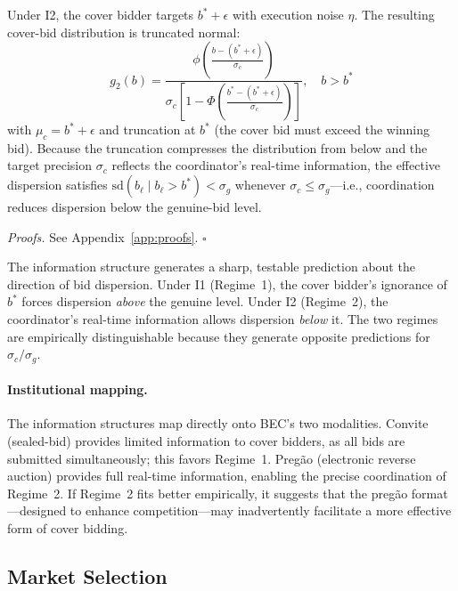 \begin{proposition}
\label{prop:regime2}
Under I2, the cover bidder targets $b^* + \epsilon$ with execution
noise $\eta$. The resulting cover-bid distribution is truncated
normal:
\begin{equation}
  g_2(b) = \frac{\phi\!\left(\frac{b - (b^* + \epsilon)}
  {\sigma_c}\right)}{\sigma_c\left[1 - \Phi\!\left(
  \frac{b^* - (b^* + \epsilon)}{\sigma_c}\right)\right]},
  \quad b > b^*
  \label{eq:regime2}
\end{equation}
with $\mu_c = b^* + \epsilon$ and truncation at $b^*$ (the cover
bid must exceed the winning bid). Because the truncation compresses
the distribution from below and the target precision $\sigma_c$
reflects the coordinator's real-time information, the effective
dispersion satisfies $\text{sd}(b_\ell \mid b_\ell > b^*) <
\sigma_g$ whenever $\sigma_c \leq \sigma_g$---i.e., coordination
reduces dispersion below the genuine-bid level.
\end{proposition}

\noindent\emph{Proofs.} See Appendix~\ref{app:proofs}. \hfill$\square$

\medskip

The information structure generates a sharp, testable prediction
about the direction of bid dispersion. Under I1 (Regime~1), the
cover bidder's ignorance of $b^*$ forces dispersion \emph{above}
the genuine level. Under I2 (Regime~2), the coordinator's
real-time information allows dispersion \emph{below} it. The two
regimes are empirically distinguishable because they generate
opposite predictions for $\sigma_c / \sigma_g$.

\paragraph{Institutional mapping.}
The information structures map directly onto BEC's two modalities.
Convite (sealed-bid) provides limited information to cover bidders,
as all bids are submitted simultaneously; this favors Regime~1.
Preg\~ao (electronic reverse auction) provides full real-time
information, enabling the precise coordination of Regime~2. If
Regime~2 fits better empirically, it suggests that the preg\~ao
format---designed to enhance competition---may inadvertently
facilitate a more effective form of cover bidding.


\subsection{Market Selection}
\label{sec:market_selection}

